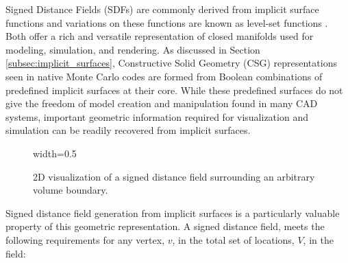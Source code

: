 Signed Distance Fields (SDFs) are commonly derived from implicit surface
functions and variations on these functions are known as level-set functions
\cite{Osher_2003}. Both offer a rich and versatile representation of closed
manifolds used for modeling, simulation, and rendering. As discussed in Section
\ref{subsec:implicit_surfaces}, Constructive Solid Geometry (CSG)
representations seen in native Monte Carlo codes are formed from Boolean
combinations of predefined implicit surfaces at their core. While these
predefined surfaces do not give the freedom of model creation and manipulation
found in many CAD systems, important geometric information required for
visualization and simulation can be readily recovered from implicit surfaces.

\begin{figure}[H]
  {width=0.5\textwidth}
  \centering
  \caption[2D depiction of a signed distance field.]{2D visualization of a signed distance field surrounding an arbitrary volume boundary.}
  \label{fig:preconditioner_datastruct}
\end{figure}





Signed distance field generation from implicit surfaces is a particularly
valuable property of this geometric representation. A signed distance field,
meets the following requirements for any vertex, $v$, in the
total set of locations, $V$, in the field:

